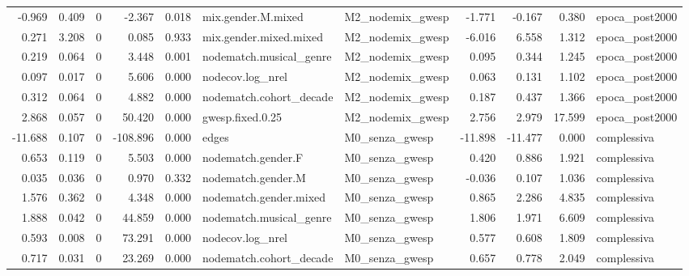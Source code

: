 \begin{table}
\begin{tabular}{rrrrrllrrrl}
   -0.969 & 0.409 &        0 &   -2.367 &     0.018 &      mix.gender.M.mixed & M2\_nodemix\_gwesp &  -1.771 &  -0.167 &   0.380 &              epoca\_post2000 \\
    0.271 & 3.208 &        0 &    0.085 &     0.933 &  mix.gender.mixed.mixed & M2\_nodemix\_gwesp &  -6.016 &   6.558 &   1.312 &              epoca\_post2000 \\
    0.219 & 0.064 &        0 &    3.448 &     0.001 & nodematch.musical\_genre & M2\_nodemix\_gwesp &   0.095 &   0.344 &   1.245 &              epoca\_post2000 \\
    0.097 & 0.017 &        0 &    5.606 &     0.000 &        nodecov.log\_nrel & M2\_nodemix\_gwesp &   0.063 &   0.131 &   1.102 &              epoca\_post2000 \\
    0.312 & 0.064 &        0 &    4.882 &     0.000 & nodematch.cohort\_decade & M2\_nodemix\_gwesp &   0.187 &   0.437 &   1.366 &              epoca\_post2000 \\
    2.868 & 0.057 &        0 &   50.420 &     0.000 &        gwesp.fixed.0.25 & M2\_nodemix\_gwesp &   2.756 &   2.979 &  17.599 &              epoca\_post2000 \\
  -11.688 & 0.107 &        0 & -108.896 &     0.000 &                   edges &   M0\_senza\_gwesp & -11.898 & -11.477 &   0.000 &                 complessiva \\
    0.653 & 0.119 &        0 &    5.503 &     0.000 &      nodematch.gender.F &   M0\_senza\_gwesp &   0.420 &   0.886 &   1.921 &                 complessiva \\
    0.035 & 0.036 &        0 &    0.970 &     0.332 &      nodematch.gender.M &   M0\_senza\_gwesp &  -0.036 &   0.107 &   1.036 &                 complessiva \\
    1.576 & 0.362 &        0 &    4.348 &     0.000 &  nodematch.gender.mixed &   M0\_senza\_gwesp &   0.865 &   2.286 &   4.835 &                 complessiva \\
    1.888 & 0.042 &        0 &   44.859 &     0.000 & nodematch.musical\_genre &   M0\_senza\_gwesp &   1.806 &   1.971 &   6.609 &                 complessiva \\
    0.593 & 0.008 &        0 &   73.291 &     0.000 &        nodecov.log\_nrel &   M0\_senza\_gwesp &   0.577 &   0.608 &   1.809 &                 complessiva \\
    0.717 & 0.031 &        0 &   23.269 &     0.000 & nodematch.cohort\_decade &   M0\_senza\_gwesp &   0.657 &   0.778 &   2.049 &                 complessiva \\

\end{tabular}
\end{table}
